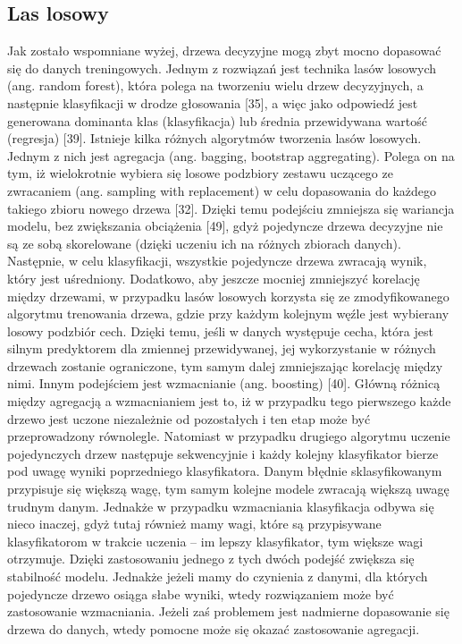 \subsection{Las losowy}
\label{cha:Las losowy}

Jak zostało wspomniane wyżej, drzewa decyzyjne mogą zbyt mocno dopasować się do danych treningowych. Jednym z rozwiązań jest technika lasów losowych (ang. random forest), która polega na tworzeniu wielu drzew decyzyjnych, a następnie klasyfikacji w drodze głosowania [35], a więc jako odpowiedź jest generowana dominanta klas (klasyfikacja) lub średnia przewidywana wartość (regresja) [39]. Istnieje kilka różnych algorytmów tworzenia lasów losowych. Jednym z nich jest agregacja (ang. bagging, bootstrap aggregating). Polega on na tym, iż wielokrotnie wybiera się losowe podzbiory zestawu uczącego ze zwracaniem (ang. sampling with replacement) w celu dopasowania do każdego takiego zbioru nowego drzewa [32]. Dzięki temu podejściu zmniejsza się wariancja modelu, bez zwiększania obciążenia [49], gdyż pojedyncze drzewa decyzyjne nie są ze sobą skorelowane (dzięki uczeniu ich na różnych zbiorach danych). Następnie, w celu klasyfikacji, wszystkie pojedyncze drzewa zwracają wynik, który jest uśredniony. Dodatkowo, aby jeszcze mocniej zmniejszyć korelację między drzewami, w przypadku lasów losowych korzysta się ze zmodyfikowanego algorytmu trenowania drzewa, gdzie przy każdym kolejnym węźle jest wybierany losowy podzbiór cech. Dzięki temu, jeśli w danych występuje cecha, która jest silnym predyktorem dla zmiennej przewidywanej, jej wykorzystanie w różnych drzewach zostanie ograniczone, tym samym dalej zmniejszając korelację między nimi.
Innym podejściem jest wzmacnianie (ang. boosting) [40]. Główną różnicą między agregacją a wzmacnianiem jest to, iż w przypadku tego pierwszego każde drzewo jest uczone niezależnie od pozostałych i ten etap może być przeprowadzony równolegle. Natomiast w przypadku drugiego algorytmu uczenie pojedynczych drzew następuje sekwencyjnie i każdy kolejny klasyfikator bierze pod uwagę wyniki poprzedniego klasyfikatora. Danym błędnie sklasyfikowanym przypisuje się większą wagę, tym samym kolejne modele zwracają większą uwagę trudnym danym. Jednakże w przypadku wzmacniania klasyfikacja odbywa się nieco inaczej, gdyż tutaj również mamy wagi, które są przypisywane klasyfikatorom w trakcie uczenia – im lepszy klasyfikator, tym większe wagi otrzymuje. Dzięki zastosowaniu jednego z tych dwóch podejść zwiększa się stabilność modelu. Jednakże jeżeli mamy do czynienia z danymi, dla których pojedyncze drzewo osiąga słabe wyniki, wtedy rozwiązaniem może być zastosowanie wzmacniania. Jeżeli zaś problemem jest nadmierne dopasowanie się drzewa do danych, wtedy pomocne może się okazać zastosowanie agregacji.


